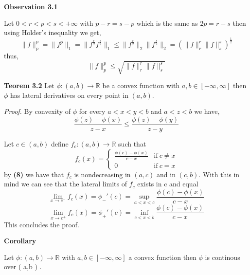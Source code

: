\documentclass{article}
\begin{document}
\bigbreak

\begin{observation}\textbf{Observation 3.1}

Let $0 < r < p < s < +\infty$ with $p-r=s-p$ which is the same as $2p=r+s$ then using Holder's inequality we get,  
\[
    \|f\|_p^p = \|f^p\|_1 = \|f^{\frac{r}{2}}f^{\frac{s}{2}}\|_1 \le \|f^{\frac{r}{2}}\|_2 \|f^{\frac{s}{2}}\|_2 = \left( \|f\|_r^r \|f\|_s^s   \right)^{\frac{1}{2}}    
\]
thus,
\[
    \|f\|_p^p \le \sqrt{\|f\|_r^r \|f\|_s^s  }   
\]
\end{observation}

\begin{theorem}\textbf{Teorem 3.2}
    Let $\phi : \left( a,b \right) \rightarrow \mathbb{R}$ be a convex function with $a,b \in [-\infty,\infty]$ then $\phi$ has lateral derivatives on every point in $ \left( a,b \right) $.

    \textit{Proof.} By convexity of $\phi$ for every $a < x < y < b$ and $a< z <b$  we have,
    \begin{equation}
        \frac{\phi \left( z \right) - \phi \left( x \right) }{z - x} \le \frac{\phi \left( z \right) - \phi \left( y \right) }{z - y}
    \end{equation}

    Let $c \in \left( a,b \right) $ define $f_c: \left( a,b \right) \rightarrow \mathbb{R}$ such that
    \[
    f_c \left( x \right) = 
       \begin{cases}
           \frac{\phi(c)-\phi(x)}{c-x} & \text{if}\  c \neq x \\
           0 & \text{if}\ c = x
       \end{cases}
    \]
    by \textbf{(8)} we have that $f_c$ is nondecreasing in $ \left( a,c \right) $ and in $ \left( c,b \right) $. With this in mind we can see that the lateral limits of $f_c$ exists in c and equal
    \[
        \lim_{x \to c^-}f_c \left( x \right) = \phi_{-}' \left( c \right) = \sup_{a < x < c}\frac{\phi(c)-\phi(x)}{c-x} 
    \]
    \[
        \lim_{x \to c^+}f_c \left( x \right) = \phi_{+}' \left( c \right)  = \inf_{c < x < b}\frac{\phi(c)-\phi(x)}{c-x}
    \]
    This concludes the proof.
\end{theorem}

\bigbreak

\begin{corollary}\textbf{Corollary}

    Let $\phi: \left( a,b \right) \rightarrow \mathbb{R}$ with $a,b \in [-\infty, \infty]$ a convex function then $\phi$ is continous over \left( a,b \right) .
    
\end{corollary}
\end{document}
